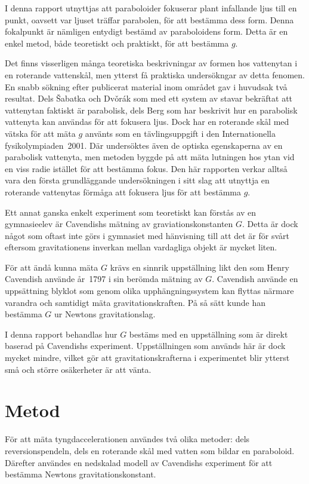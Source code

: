 \documentclass[11pt,a4paper]{article}
\begin{document}
I denna rapport utnyttjas att paraboloider fokuserar plant infallande ljus till en punkt, oavsett var ljuset träffar parabolen, för att bestämma dess form. Denna fokalpunkt är nämligen entydigt bestämd av paraboloidens form. Detta är en enkel metod, både teoretiskt och praktiskt, för att bestämma $g$. 

Det finns visserligen många teoretiska beskrivningar av formen hos vattenytan i en roterande vattenskål, men ytterst få praktiska undersökngar av detta fenomen. En snabb sökning efter publicerat material inom området gav i huvudsak två resultat. Dels \v{S}abatka och Dv\v{o}rák\cite{Sabatka2010} som med ett system av stavar bekräftat att vattenytan faktiskt är parabolisk, dels Berg\cite{Berg1990} som har beskrivit hur en parabolisk vattenyta kan användas för att fokusera ljus. %
Dock har en roterande skål med vätska för att mäta $g$ använts som en tävlingsuppgift i den Internationella fysik\-olympiaden~2001\cite{IPhO2001}. Där undersöktes även de optiska egenskaperna av en parabolisk vattenyta, men metoden byggde på att mäta lutningen hos ytan vid en viss radie istället för att bestämma fokus. Den här rapporten verkar alltså vara den första grundläggande undersökningen i sitt slag att utnyttja en roterande vattenytas förmåga att fokusera ljus för att bestämma $g$.

Ett annat ganska enkelt experiment som teoretiskt kan förstås av en gymnasieelev är Cavendishs mätning av graviationskonstanten $G$. Detta är dock något som oftast inte görs i gymnasiet med hänvisning till att det är för svårt eftersom gravitationens inverkan mellan vardagliga objekt är mycket liten. 

För att ändå kunna mäta $G$ krävs en sinnrik uppställning likt den som Henry Cavendish använde år~1797 i sin berömda mätning av $G$. Cavendish använde en uppsättning blyklot som genom olika upphängningssystem kan flyttas närmare varandra och samtidigt mäta gravitationskraften. På så sätt kunde han bestämma $G$ ur Newtons gravitationslag.\cite{wiki:cavendish_experiment} 

I denna rapport behandlas hur $G$ bestäms med en uppställning som är direkt baserad på Cavendishs experiment. Uppställningen som används här är dock mycket mindre, vilket gör att gravitationskrafterna i experimentet blir ytterst små och större osäkerheter är att vänta.




\section{Metod}
För att mäta tyngdaccelerationen användes två olika metoder: dels reversionspendeln, dels en roterande skål med vatten som bildar en paraboloid. Därefter användes en nedskalad modell av Cavendishs experiment för att bestämma Newtons gravitationskonstant. 
\end{document}
